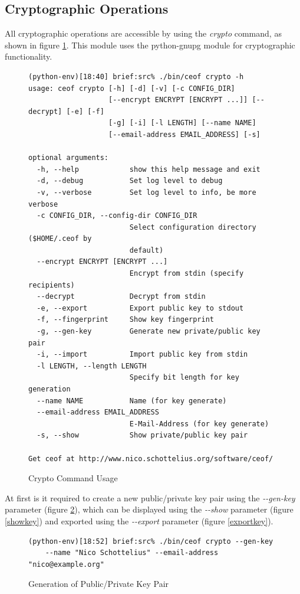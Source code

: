 \subsection{Cryptographic Operations}
All cryptographic operations are accessible by using the \textit{crypto}
command, as shown in figure \ref{cryptohelp}.
This module uses the python-gnupg module for cryptographic functionality.
\begin{figure}[htbp]
\caption{Crypto Command Usage}
\label{cryptohelp}
\begin{verbatim}
(python-env)[18:40] brief:src% ./bin/ceof crypto -h
usage: ceof crypto [-h] [-d] [-v] [-c CONFIG_DIR]
                   [--encrypt ENCRYPT [ENCRYPT ...]] [--decrypt] [-e] [-f]
                   [-g] [-i] [-l LENGTH] [--name NAME]
                   [--email-address EMAIL_ADDRESS] [-s]

optional arguments:
  -h, --help            show this help message and exit
  -d, --debug           Set log level to debug
  -v, --verbose         Set log level to info, be more verbose
  -c CONFIG_DIR, --config-dir CONFIG_DIR
                        Select configuration directory ($HOME/.ceof by
                        default)
  --encrypt ENCRYPT [ENCRYPT ...]
                        Encrypt from stdin (specify recipients)
  --decrypt             Decrypt from stdin
  -e, --export          Export public key to stdout
  -f, --fingerprint     Show key fingerprint
  -g, --gen-key         Generate new private/public key pair
  -i, --import          Import public key from stdin
  -l LENGTH, --length LENGTH
                        Specify bit length for key generation
  --name NAME           Name (for key generate)
  --email-address EMAIL_ADDRESS
                        E-Mail-Address (for key generate)
  -s, --show            Show private/public key pair

Get ceof at http://www.nico.schottelius.org/software/ceof/
\end{verbatim}
\end{figure}
At first is it required to create a new public/private key pair using
the \textit{-{}-gen-key} parameter (figure \ref{genkey}), which can
be displayed using the \textit{-{}-show} parameter (figure \ref{showkey})
and exported using the \textit{-{}-export}
parameter (figure \ref{exportkey}).
\begin{figure}[htbp]
\caption{Generation of Public/Private Key Pair}
\label{genkey}
\begin{verbatim}
(python-env)[18:52] brief:src% ./bin/ceof crypto --gen-key 
    --name "Nico Schottelius" --email-address "nico@example.org"
\end{verbatim}
\end{figure}
